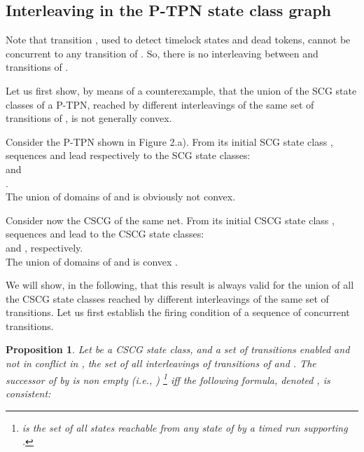 \documentclass[submission,copyright,creativecommons]{eptcs}
\newtheorem{proposition}{Proposition}
\numberwithin{equation}{section}
\begin{document}
\subsection{Interleaving in the P-TPN state class graph}
Note that transition , used to detect timelock states and dead tokens, cannot be concurrent to any transition of . So, there is no interleaving between  and transitions of .
\par Let us first show, by means of a counterexample, that the union of the SCG state classes of a P-TPN, reached by different interleavings of the same set of transitions of , is not generally convex.
\par Consider the P-TPN shown in Figure 2.a). From its
initial SCG state class , sequences  and  lead
respectively to the SCG state classes: \\  and \\ .\\ The union of domains of  and  is obviously not convex.
\par Consider now the CSCG of the same net. From its initial CSCG state class , sequences  and  lead to the CSCG state classes:\\  and , respectively.\\ The union of domains of  and  is convex .
\par We will show, in the following, that this result is always valid for the union of all the CSCG state classes reached by different interleavings of the same set of transitions. Let us first establish the firing condition of a sequence of concurrent transitions.

\begin{proposition} \label{prop}
Let  be a CSCG state class, and  a set of transitions enabled and not in conflict in ,  the set of all interleavings of transitions of  and .
The successor of  by  is non empty (i.e., ) \footnote{ is the set of all states reachable from any state of  by a timed run supporting .} iff the following formula, denoted , is consistent:
 

\end{proposition}
\end{document}
